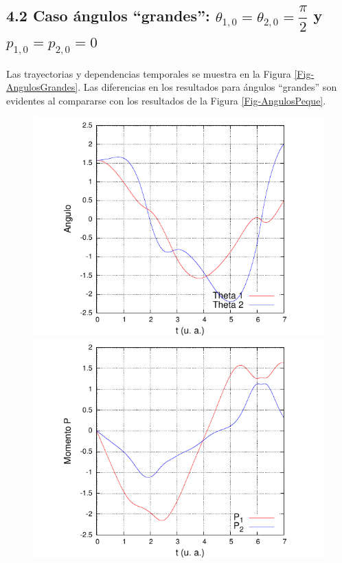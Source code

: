 \documentclass[10pt,letterpaper]{article}
\begin{document}
\subsection*{4.2 Caso ángulos ``grandes'': $\theta_{1,0} = \theta_{2,0} = \dfrac{\pi}{2}$ y $p_{1,0} = p_{2,0} = 0$}
Las trayectorias y dependencias temporales se muestra en la Figura \ref{Fig-AngulosGrandes}. Las diferencias en los resultados para ángulos ``grandes'' son evidentes al compararse con los resultados de la Figura \ref{Fig-AngulosPeque}.
\begin{figure}
\centering
\includegraphics[scale=0.9]{BGrafica_Theta_Tiempo.pdf}
\includegraphics[scale=0.9]{BGrafica_P_Tiempo.pdf}

\end{figure}
\end{document}
